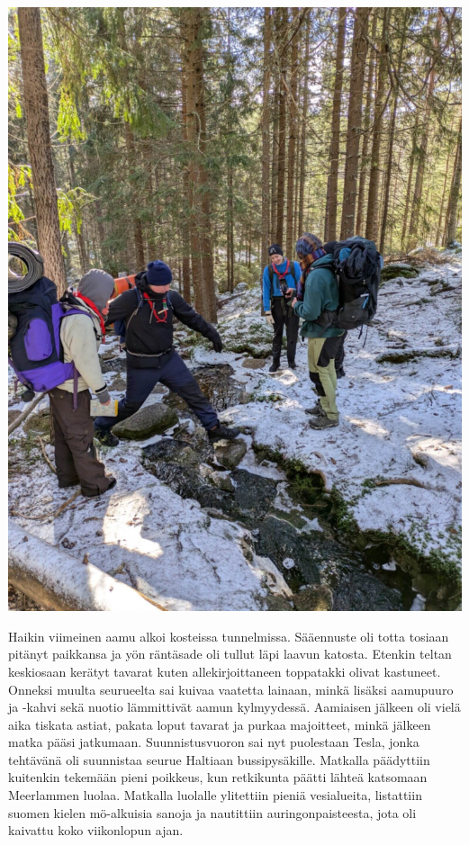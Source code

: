 \begin{multicols}{2}
\vfill\null
\columnbreak

\begin{center}
\noindent\includegraphics[width=1.0\linewidth,trim={0 0 0 0},clip]{assets/minihaikki5}
\end{center}

Haikin viimeinen aamu alkoi kosteissa tunnelmissa. Sääennuste oli totta tosiaan
pitänyt paikkansa ja yön räntäsade oli tullut läpi laavun katosta. Etenkin
teltan keskiosaan kerätyt tavarat kuten allekirjoittaneen toppatakki olivat
kastuneet. Onneksi muulta seurueelta sai kuivaa vaatetta lainaan, minkä lisäksi
aamupuuro ja -kahvi sekä nuotio lämmittivät aamun kylmyydessä. Aamiaisen
jälkeen oli vielä aika tiskata astiat, pakata loput tavarat ja purkaa
majoitteet, minkä jälkeen matka pääsi jatkumaan. Suunnistusvuoron sai nyt
puolestaan Tesla, jonka tehtävänä oli suunnistaa seurue Haltiaan
bussipysäkille. Matkalla päädyttiin kuitenkin tekemään pieni poikkeus, kun
retkikunta päätti lähteä katsomaan Meerlammen luolaa. Matkalla luolalle
ylitettiin pieniä vesialueita, listattiin suomen kielen mö-alkuisia sanoja ja
nautittiin auringonpaisteesta, jota oli kaivattu koko viikonlopun ajan.


\end{multicols}
